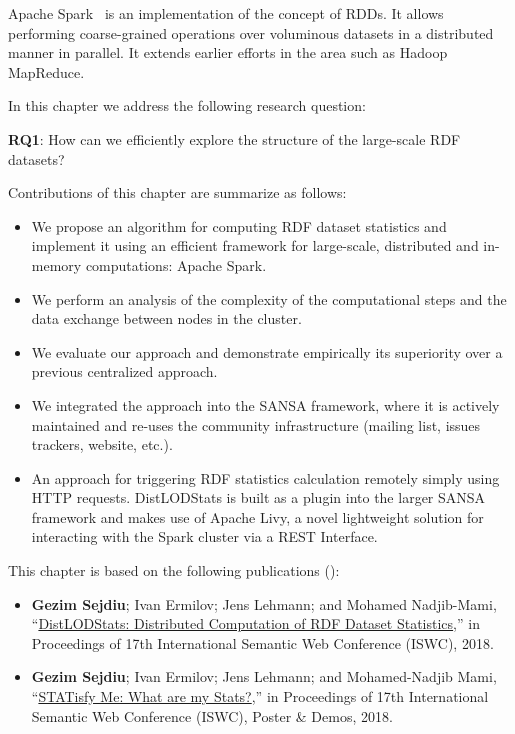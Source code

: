 Apache Spark~ is an implementation of the concept of \gls{RDD}s.
It allows performing coarse-grained operations over voluminous datasets in a distributed manner in parallel.
It extends earlier efforts in the area such as Hadoop MapReduce.

In this chapter we address the following research question:
\begin{tcolorbox}
\textbf{RQ1}: How can we efficiently explore the structure of the large-scale \gls{RDF} datasets?
\end{tcolorbox}

Contributions of this chapter are summarize as follows:
\begin{itemize}
    \item We propose an algorithm for computing \gls{RDF} dataset statistics and implement it using an efficient framework for large-scale, distributed and in-memory computations: Apache Spark.
    \item We perform an analysis of the complexity of the computational steps and the data exchange between nodes in the cluster. 
    \item We evaluate our approach and demonstrate empirically its superiority over a previous centralized approach.
    \item We integrated the approach into the SANSA framework, where it is actively maintained and re-uses the community infrastructure (mailing list, issues trackers, website, etc.).
    \item An approach for triggering \gls{RDF} statistics calculation remotely simply using HTTP requests. 
    DistLODStats is built as a plugin into the larger SANSA framework and makes use of Apache Livy, a novel lightweight solution for interacting with the Spark cluster via a REST Interface.
\end{itemize}

This chapter is based on the following publications (\cite{sejdiu-2018-dist-lod-stats-iswc,sejdiu-2018-statisfy-iswc-poster}):
\begin{itemize}
    \item \textbf{Gezim Sejdiu}; Ivan Ermilov; Jens Lehmann; and Mohamed Nadjib-Mami, “\href{http://jens-lehmann.org/files/2018/iswc_distlodstats.pdf}{DistLODStats: Distributed Computation of RDF Dataset Statistics},” in Proceedings of 17th International Semantic Web Conference (ISWC), 2018.

    \item \textbf{Gezim Sejdiu}; Ivan Ermilov; Jens Lehmann; and Mohamed-Nadjib Mami, “\href{http://jens-lehmann.org/files/2018/iswc_statisfy_pd.pdf}{STATisfy Me: What are my Stats?},” in Proceedings of 17th International Semantic Web Conference (ISWC), Poster \& Demos, 2018.
\end{itemize}

